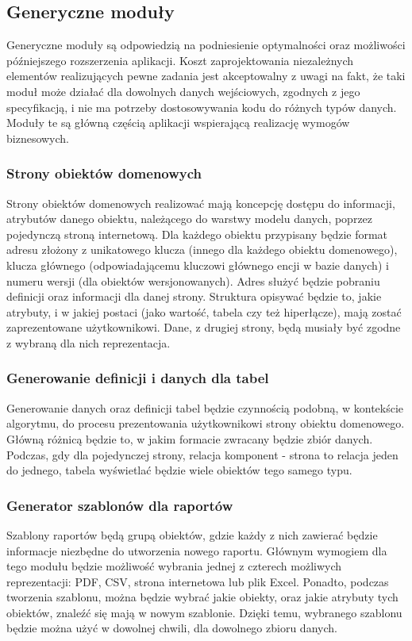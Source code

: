 		\subsection{Generyczne moduły}
			Generyczne moduły są odpowiedzią na podniesienie optymalności oraz możliwości późniejszego rozszerzenia aplikacji. Koszt zaprojektowania niezależnych elementów realizujących pewne zadania jest akceptowalny z uwagi na fakt, że taki moduł może działać dla dowolnych danych wejściowych, zgodnych z jego specyfikacją, i nie ma potrzeby dostosowywania kodu do różnych typów danych. Moduły te są główną częścią aplikacji wspierającą realizację wymogów biznesowych.
			
		\subsubsection{Strony obiektów domenowych}
			Strony obiektów domenowych realizować mają koncepcję dostępu do informacji, atrybutów danego obiektu, należącego do warstwy modelu danych, poprzez pojedynczą stroną internetową. Dla każdego obiektu przypisany będzie format adresu złożony z unikatowego klucza (innego dla każdego obiektu domenowego), klucza głównego (odpowiadającemu kluczowi głównego encji w bazie danych) i numeru wersji (dla obiektów wersjonowanych). Adres służyć będzie pobraniu definicji oraz informacji dla danej strony. Struktura opisywać będzie to, jakie atrybuty, i w jakiej postaci (jako wartość, tabela czy też hiperłącze), mają zostać zaprezentowane użytkownikowi. Dane, z drugiej strony, będą musiały być zgodne z wybraną dla nich reprezentacja. 
		\subsubsection{Generowanie definicji i danych dla tabel}
			Generowanie danych oraz definicji tabel będzie czynnością podobną, w kontekście algorytmu, do procesu prezentowania użytkownikowi strony obiektu domenowego. Główną różnicą będzie to, w jakim formacie zwracany będzie zbiór danych. Podczas, gdy dla pojedynczej strony, relacja komponent - strona to relacja jeden do jednego, tabela wyświetlać będzie wiele obiektów tego samego typu. 
		\subsubsection{Generator szablonów dla raportów}
			Szablony raportów będą grupą obiektów, gdzie każdy z nich zawierać będzie informacje niezbędne do utworzenia nowego raportu. Głównym wymogiem dla tego modułu będzie możliwość wybrania jednej z czterech możliwych reprezentacji: PDF, CSV, strona internetowa lub plik Excel. Ponadto, podczas tworzenia szablonu, można będzie wybrać jakie obiekty, oraz jakie atrybuty tych obiektów, znaleźć się mają w nowym szablonie. Dzięki temu, wybranego szablonu będzie można użyć w dowolnej chwili, dla dowolnego zbioru danych.
